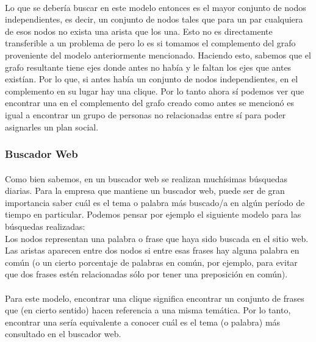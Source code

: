 \paragraph{}
Lo que se debería buscar en este modelo entonces es el mayor conjunto de nodos independientes, es decir, un conjunto de nodos tales que para un par cualquiera de esos nodos no exista una arista que los una. Esto no es directamente transferible a un problema de \mc pero lo es si tomamos el complemento del grafo proveniente del modelo anteriormente mencionado. Haciendo esto, sabemos que el grafo resultante tiene ejes donde antes no había y le faltan los ejes que antes existían. Por lo que, si antes había un conjunto de nodos independientes, en el complemento en su lugar hay una clique. Por lo tanto ahora sí podemos ver que encontrar una \mc en el complemento del grafo creado como antes se mencionó es igual a encontrar un grupo de personas no relacionadas entre sí para poder asignarles un plan social.


\subsubsection{Buscador Web}

\paragraph{}
Como bien sabemos, en un buscador web se realizan muchísimas búsquedas diarias. Para la empresa que mantiene un buscador web, puede ser de gran importancia saber cuál es el tema o palabra más buscado/a en algún período de tiempo en particular. Podemos pensar por ejemplo el siguiente modelo para las búsquedas realizadas:\\
Los nodos representan una palabra o frase que haya sido buscada en el sitio web. Las aristas aparecen entre dos nodos si entre esas frases hay alguna palabra en común (o un cierto porcentaje de palabras en común, por ejemplo, para evitar que dos frases estén relacionadas sólo por tener una preposición en común).

\paragraph{}
Para este modelo, encontrar una clique significa encontrar un conjunto de frases que (en cierto sentido) hacen referencia a una misma temática. Por lo tanto, encontrar una \mc sería equivalente a conocer cuál es el tema (o palabra) más consultado en el buscador web.

